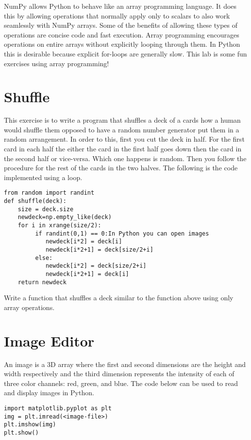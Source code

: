 \label{lab:Python_Vectorization}

NumPy allows Python to behave like an array programming language.
It does this by allowing operations that normally apply only to scalars to also work seamlessly with NumPy arrays.
Some of the benefits of allowing these types of operations are concise code and fast execution.
Array programming encourages operations on entire arrays without explicitly looping through them.
In Python this is desirable because explicit for-loops are generally slow.
This lab is some fun exercises using array programming!

\section*{Shuffle}
This exercise is to write a program that shuffles a deck of a cards how a human 
would shuffle them opposed to have a random number generator put them in a random arrangement. 
In order to this, first you cut the deck in half. 
For the first card in each half the either the card in the first half goes down then 
the card in the second half or vice-versa. Which one happens is random. 
Then you follow the procedure for the rest of the cards in the two halves. 
The following is the code implemented using a loop. 
\begin{lstlisting}
from random import randint
def shuffle(deck):
    size = deck.size
    newdeck=np.empty_like(deck)
    for i in xrange(size/2):
         if randint(0,1) == 0:In Python you can open images
            newdeck[i*2] = deck[i]
            newdeck[i*2+1] = deck[size/2+i]
         else:
            newdeck[i*2] = deck[size/2+i]
            newdeck[i*2+1] = deck[i]
    return newdeck
\end{lstlisting}

\begin{problem}
Write a function that shuffles a deck similar to the function above using only array operations.
\end{problem}

\section*{Image Editor}
An image is a 3D array where the first and second dimensions are the height and width respectively 
and the third dimension represents the intensity of each of three color channels: red, green, and blue.
The code below can be used to read and display images in Python.
\begin{lstlisting}
import matplotlib.pyplot as plt
img = plt.imread(<image-file>)
plt.imshow(img)
plt.show()
\end{lstlisting}

